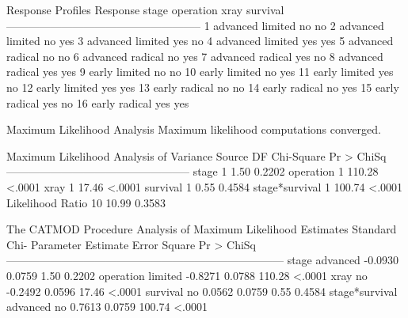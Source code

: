 \documentclass{article}
\begin{document}
\begin{Woutput}
                  Response Profiles
Response    stage       operation    xray    survival
-----------------------------------------------------
    1       advanced    limited      no      no
    2       advanced    limited      no      yes
    3       advanced    limited      yes     no
    4       advanced    limited      yes     yes
    5       advanced    radical      no      no
    6       advanced    radical      no      yes
    7       advanced    radical      yes     no
    8       advanced    radical      yes     yes
    9       early       limited      no      no
   10       early       limited      no      yes
   11       early       limited      yes     no
   12       early       limited      yes     yes
   13       early       radical      no      no
   14       early       radical      no      yes
   15       early       radical      yes     no
   16       early       radical      yes     yes

                   Maximum Likelihood Analysis
           Maximum likelihood computations converged.

     Maximum Likelihood Analysis of Variance
Source               DF   Chi-Square    Pr > ChiSq
--------------------------------------------------
stage                 1         1.50        0.2202
operation             1       110.28        <.0001
xray                  1        17.46        <.0001
survival              1         0.55        0.4584
stage*survival        1       100.74        <.0001
Likelihood Ratio     10        10.99        0.3583

The CATMOD Procedure
                 Analysis of Maximum Likelihood Estimates
                                         Standard        Chi-
Parameter                     Estimate      Error      Square    Pr > ChiSq
---------------------------------------------------------------------------
stage          advanced        -0.0930     0.0759        1.50        0.2202
operation      limited         -0.8271     0.0788      110.28        <.0001
xray           no              -0.2492     0.0596       17.46        <.0001
survival       no               0.0562     0.0759        0.55        0.4584
stage*survival advanced no      0.7613     0.0759      100.74        <.0001
\end{Woutput}
\end{document}
